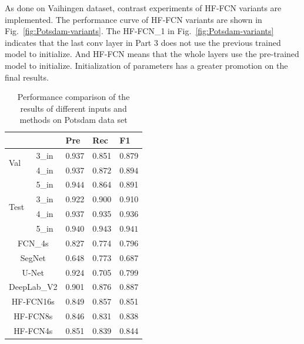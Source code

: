  As done on Vaihingen dataset, contrast experiments of HF-FCN variants are implemented. The performance curve of HF-FCN variants are shown in Fig.~\ref{fig:Potsdam-variants}.
 The HF-FCN\_1 in Fig.~\ref{fig:Potsdam-variants} indicates that the last conv layer in Part 3 does not use the previous trained model to initialize. And HF-FCN means that the whole layers use the pre-trained model to initialize. Initialization of parameters has a greater promotion on the final results.

\begin{table}[htbp]
\caption {Performance comparison of the results of different inputs and methods on Potsdam data set}
\label{table:Potsdam-3-4-5in-comp}
\centering
\begin{tabular}{p{0.5cm}<{\centering}|p{1.1cm}<{\centering}|p{1.1cm}<{\centering}|p{1.1cm}<{\centering}|p{1.1cm}<{\centering}}
\hline
&&Pre&Rec&F1\\
\hline
\multirow{2}{*}{Val}&3\_in&0.937&0.851&0.879\\
&4\_in&0.937&$\bm{0.872}$&$\bm{0.894}$\\
&5\_in&$\bm{0.944}$&0.864&0.891\\
\hline
\multirow{2}{*}{Test}&3\_in&0.922&0.900&0.910\\
&4\_in&0.937&0.935&0.936\\
&5\_in&$\bm{0.940}$&$\bm{0.943}$&$\bm{0.941}$\\
\hline\hline
\multicolumn{2}{c|}{FCN\_4s\cite{IEEEexample:Long_2015_CVPR}}&{0.827}&{0.774}&{0.796}\\
\multicolumn{2}{c|}{SegNet\cite{IEEEexample:badrinarayanan2017segnet}}&{0.648}&{0.773}&{0.687}\\
\multicolumn{2}{c|}{U-Net\cite{IEEEexample:ronneberger2015u}}&$\bm{0.924}$&{0.705}&{0.799}\\
\multicolumn{2}{c|}{DeepLab\_V2\cite{IEEEexample:chen2016deeplab}}&{0.901}&$\bm{0.876}$&$\bm{0.887}$\\
\hline \hline
\multicolumn{2}{c|}{HF-FCN16s}&{0.849}&{0.857}&{0.851}\\
\multicolumn{2}{c|}{HF-FCN8s}&{0.846}&{0.831}&{0.838}\\
\multicolumn{2}{c|}{HF-FCN4s}&{0.851}&{0.839}&{0.844}\\
\hline
\end{tabular}
\end{table}

